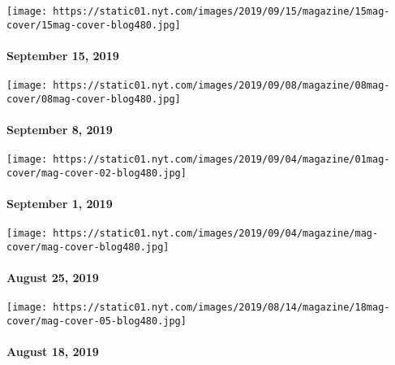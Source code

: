 \href{https://www.nytimes.com/issue/magazine/2019/09/13/the-91519-issue}{}

\texttt{[image: https://static01.nyt.com/images/2019/09/15/magazine/15mag-cover/15mag-cover-blog480.jpg]}

\hypertarget{september-15-2019}{%
\paragraph{September 15, 2019}\label{september-15-2019}}

\href{https://www.nytimes.com/issue/magazine/2019/09/05/the-9819-issue}{}

\texttt{[image: https://static01.nyt.com/images/2019/09/08/magazine/08mag-cover/08mag-cover-blog480.jpg]}

\hypertarget{september-8-2019}{%
\paragraph{September 8, 2019}\label{september-8-2019}}

\href{https://www.nytimes.com/issue/magazine/2019/09/04/the-90119-issue}{}

\texttt{[image: https://static01.nyt.com/images/2019/09/04/magazine/01mag-cover/mag-cover-02-blog480.jpg]}

\hypertarget{september-1-2019}{%
\paragraph{September 1, 2019}\label{september-1-2019}}

\href{https://www.nytimes.com/issue/magazine/2019/09/04/the-82519-issue}{}

\texttt{[image: https://static01.nyt.com/images/2019/09/04/magazine/mag-cover/mag-cover-blog480.jpg]}

\hypertarget{august-25-2019}{%
\paragraph{August 25, 2019}\label{august-25-2019}}

\href{https://www.nytimes.com/interactive/2019/08/14/magazine/1619-america-slavery.html}{}

\texttt{[image: https://static01.nyt.com/images/2019/08/14/magazine/18mag-cover/mag-cover-05-blog480.jpg]}

\hypertarget{august-18-2019}{%
\paragraph{August 18, 2019}\label{august-18-2019}}

